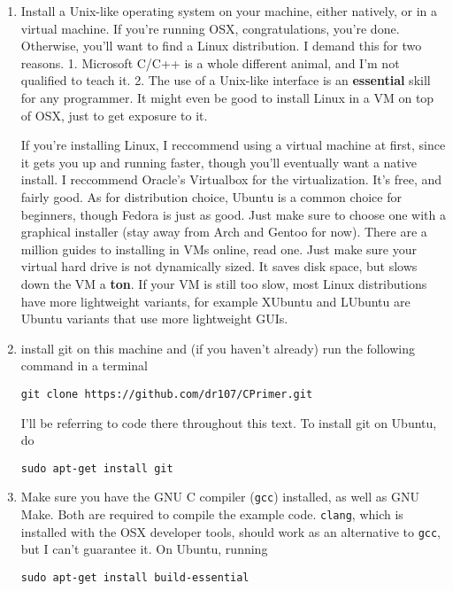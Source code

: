 \documentclass[ebook,11pt,oneside,openany]{memoir}
\begin{document}
\begin{enumerate}
\item Install a Unix-like operating system on your machine, either natively, or in a virtual machine. If you're running OSX, congratulations, you're done. Otherwise, you'll want to find a Linux distribution. I demand this for two reasons. 1. Microsoft C/C++ is a whole different animal, and I'm not qualified to teach it. 2. The use of a Unix-like interface is an \textbf{essential} skill for any programmer. It might even be good to install Linux in a VM on top of OSX, just to get exposure to it.

If you're installing Linux, I reccommend using a virtual machine at first, since it gets you up and running faster, though you'll eventually want a native install. I reccommend Oracle's Virtualbox for the virtualization. It's free, and fairly good. As for distribution choice, Ubuntu is a common choice for beginners, though Fedora is just as good. Just make sure to choose one with a graphical installer (stay away from Arch and Gentoo for now). There are a million guides to installing in VMs online, read one. Just make sure your virtual hard drive is not dynamically sized. It saves disk space, but slows down the VM a \textbf{ton}. If your VM is still too slow, most Linux distributions have more lightweight variants, for example XUbuntu and LUbuntu are Ubuntu variants that use more lightweight GUIs.

\item install git on this machine and (if you haven't already) run the following command in a terminal
\begin{verbatim}
git clone https://github.com/dr107/CPrimer.git 
\end{verbatim}

I'll be referring to code there throughout this text. To install git on Ubuntu, do

\begin{verbatim}
sudo apt-get install git
\end{verbatim}

\item Make sure you have the GNU C compiler (\texttt{gcc}) installed, as well as GNU Make. Both are required to compile the example code. \texttt{clang}, which is installed with the OSX developer tools, should work as an alternative to \texttt{gcc}, but I can't guarantee it. On Ubuntu, running 

\begin{verbatim}
sudo apt-get install build-essential
\end{verbatim}


\end{enumerate}
\end{document}
